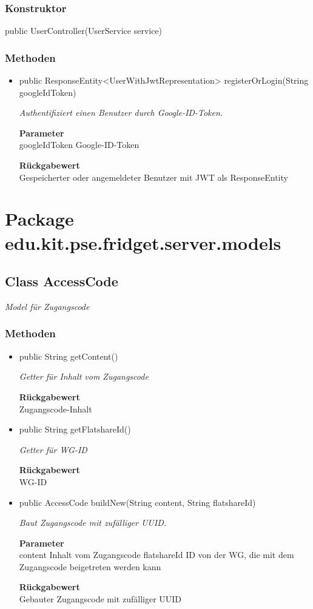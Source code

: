 \documentclass[a4paper]{scrreprt}
\begin{document}
    \subsubsection{Konstruktor}
    public UserController(UserService service)
    \subsubsection{Methoden}
    \begin{itemize}
    	\item{public ResponseEntity<UserWithJwtRepresentation> registerOrLogin(String googleIdToken)}
    	
    	\textit{Authentifiziert einen Benutzer durch Google-ID-Token.}
    	
    	\textbf{Parameter} \\
    	googleIdToken Google-ID-Token
    	
    	\textbf{Rückgabewert} \\
    	Gespeicherter oder angemeldeter Benutzer mit JWT als ResponseEntity
    \end{itemize}
    \section{Package edu.kit.pse.fridget.server.models}
    \subsection{Class AccessCode}
    \textit{Model für Zugangscode}
    \subsubsection{Methoden}
    \begin{itemize}
    	\item{public String getContent()}
    	
    	\textit{Getter für Inhalt vom Zugangscode}
    	
    	
    	
    	\textbf{Rückgabewert} \\
    	Zugangscode-Inhalt        \item{public String getFlatshareId()}
    	
    	\textit{Getter für WG-ID}
    	
    	
    	
    	\textbf{Rückgabewert} \\
    	WG-ID        \item{public AccessCode buildNew(String content, String flatshareId)}
    	
    	\textit{Baut Zugangscode mit zufälliger UUID.}
    	
    	\textbf{Parameter} \\
    	content Inhalt vom Zugangscode
    	flatshareId ID von der WG, die mit dem Zugangscode beigetreten werden kann
    	
    	\textbf{Rückgabewert} \\
    	Gebauter Zugangscode mit zufälliger UUID
    \end{itemize}
\end{document}
